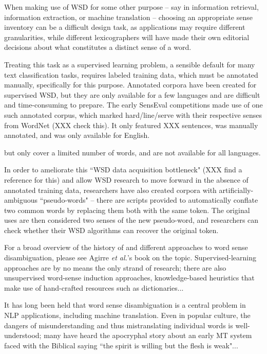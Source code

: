 When making use of WSD for some other purpose -- say in information retrieval,
information extraction, or machine translation -- choosing an appropriate sense
inventory can be a difficult design task, as applications may require different
granularities, while different lexicographers will have made their own
editorial decisions about what constitutes a distinct sense of a word.



Treating this task as a supervised learning problem, a sensible default for
many text classification tasks, requires labeled training data, which must be
annotated manually, specifically for this purpose. Annotated corpora have been
created for supervised WSD, but they are only available for a few languages and
are difficult and time-consuming to prepare.
The early SensEval competitions made use of one
such annotated corpus, which marked hard/line/serve with their respective
senses from WordNet (XXX check this). It only featured XXX sentences, was
manually annotated, and was only available for English.

but only cover a limited number of words, and are not available for all
languages.



In order to ameliorate this
``WSD data acquisition bottleneck" (XXX find a reference for this) and allow
WSD research to move forward in the absence of annotated training data,
researchers have also created corpora with artificially-ambiguous
``pseudo-words" -- there are scripts provided to automatically conflate two
common words by replacing them both with the same token. The original uses are
then considered two senses of the new pseudo-word, and researchers can check
whether their WSD algorithms can recover the original token.

For a broad overview of the history of and  different approaches to word sense
disambiguation, please see
Agirre \emph{et al.}'s book on the topic. \cite{agirre2006word}
Supervised-learning approaches are by no means the only strand of research;
there are also unsupervised word-sense induction approaches,
knowledge-based heuristics that make use of hand-crafted resources such as
dictionaries...

It has long been held that word sense disambiguation is a central problem in
NLP applications, including machine translation.
Even in popular culture, the dangers of misunderstanding and thus
mistranslating individual words is well-understood; many have heard the
apocryphal story about an early MT system faced with the Biblical saying ``the
spirit is willing but the flesh is weak"... \cite{hutchins:whiskey}

